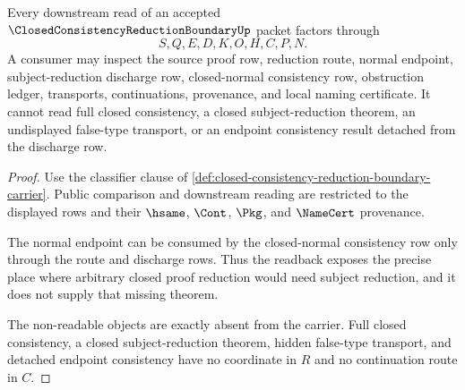 \begin{theorem}
\label{thm:closed-consistency-reduction-boundary-obstruction-readback}
Every downstream read of an accepted
$\ClosedConsistencyReductionBoundaryUp$ packet factors through
$$
S,Q,E,D,K,O,H,C,P,N.
$$
A consumer may inspect the source proof row, reduction route, normal endpoint,
subject-reduction discharge row, closed-normal consistency row, obstruction
ledger, transports, continuations, provenance, and local naming certificate.
It cannot read full closed consistency, a closed subject-reduction theorem, an
undisplayed false-type transport, or an endpoint consistency result detached
from the discharge row.
\end{theorem}
\begin{proof}
Use the classifier clause of
\autoref{def:closed-consistency-reduction-boundary-carrier}. Public comparison
and downstream reading are restricted to the displayed rows and their
$\hsame$, $\Cont$, $\Pkg$, and $\NameCert$ provenance.

The normal endpoint can be consumed by the closed-normal consistency row only
through the route and discharge rows. Thus the readback exposes the precise
place where arbitrary closed proof reduction would need subject reduction, and
it does not supply that missing theorem.

The non-readable objects are exactly absent from the carrier. Full closed
consistency, a closed subject-reduction theorem, hidden false-type transport,
and detached endpoint consistency have no coordinate in $R$ and no continuation
route in $C$.
\end{proof}

